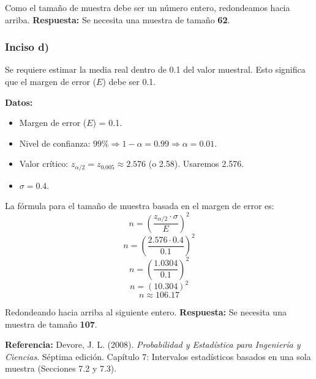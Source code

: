 \documentclass[12pt]{article}
\begin{document}
Como el tamaño de muestra debe ser un número entero, redondeamos hacia arriba.
\textbf{Respuesta:} Se necesita una muestra de tamaño \textbf{62}.

\subsubsection{Inciso d)}
Se requiere estimar la media real dentro de 0.1 del valor muestral. Esto significa que el margen de error ($E$) debe ser 0.1.

\textbf{Datos:}
\begin{itemize}
    \item Margen de error ($E$) = 0.1.
    \item Nivel de confianza: $99\% \Rightarrow 1 - \alpha = 0.99 \Rightarrow \alpha = 0.01$.
    \item Valor crítico: $z_{\alpha/2} = z_{0.005} \approx 2.576$ (o 2.58). Usaremos 2.576.
    \item $\sigma = 0.4$.
\end{itemize}

La fórmula para el tamaño de muestra basada en el margen de error es:
$$ n = \left( \frac{z_{\alpha/2} \cdot \sigma}{E} \right)^2 $$
$$ n = \left( \frac{2.576 \cdot 0.4}{0.1} \right)^2 $$
$$ n = \left( \frac{1.0304}{0.1} \right)^2 $$
$$ n = (10.304)^2 $$
$$ n \approx 106.17 $$

Redondeando hacia arriba al siguiente entero.
\textbf{Respuesta:} Se necesita una muestra de tamaño \textbf{107}.

\vspace{1em}
\noindent \textbf{Referencia:} Devore, J. L. (2008). \textit{Probabilidad y Estadística para Ingeniería y Ciencias}. Séptima edición. Capítulo 7: Intervalos estadísticos basados en una sola muestra (Secciones 7.2 y 7.3).
\end{document}
